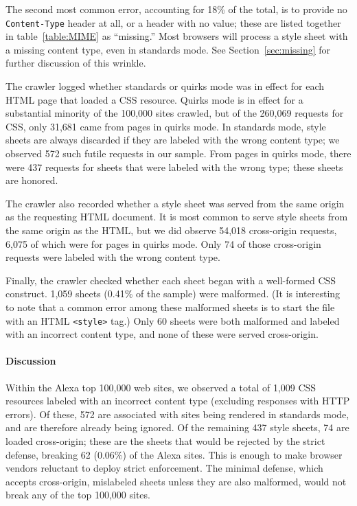 \documentclass{sig-alternate}
\begin{document}
The second most common error, accounting for 18\% of the total, is to
provide no \texttt{Content-Type} header at all, or a header with no
value; these are listed together in table~\ref{table:MIME} as
“missing.”  Most browsers will process a style sheet with a missing
content type, even in standards mode.  See
Section~\ref{sec:missing} for further discussion of this wrinkle.

The crawler logged whether standards or quirks mode was in effect for
each HTML page that loaded a CSS resource.  Quirks mode is in effect
for a substantial minority of the 100,000 sites crawled, but of the
260,069 requests for CSS, only 31,681 came from pages in quirks mode.
In standards mode, style sheets are always discarded if they are
labeled with the wrong content type; we observed 572 such futile
requests in our sample.  From pages in quirks mode, there were 437
requests for sheets that were labeled with the wrong type; these
sheets are honored.

The crawler also recorded whether a style sheet was served from the
same origin as the requesting HTML document.  It is most common to
serve style sheets from the same origin as the HTML, but we did
observe 54,018 cross-origin requests, 6,075 of which were for pages in
quirks mode.  Only 74 of those cross-origin requests were labeled with
the wrong content type.

Finally, the crawler checked whether each sheet began with a
well-formed CSS construct.  1,059 sheets (0.41\% of the sample) were
malformed.  (It is interesting to note that a common error among these
malformed sheets is to start the file with an HTML \verb|<style>|
tag.)  Only 60 sheets were both malformed and labeled with an
incorrect content type, and none of these were served cross-origin.

\paragraph{Discussion}
Within the Alexa top 100,000 web sites, we observed a total of 1,009
CSS resources labeled with an incorrect content type (excluding responses
with HTTP errors).  Of these, 572 are associated with sites being
rendered in standards mode, and are therefore already being ignored.
Of the remaining 437 style sheets, 74 are loaded cross-origin; these
are the sheets that would be rejected by the strict defense, breaking
62 (0.06\%) of the Alexa sites.  This is enough to make browser
vendors reluctant to deploy strict enforcement.  The minimal defense,
which accepts cross-origin, mislabeled sheets unless they are also
malformed, would not break any of the top 100,000 sites.
\end{document}

